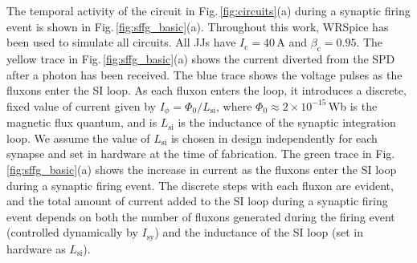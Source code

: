 \documentclass[twocolumn]{article}
\begin{document}
\begin{figure}[tb]
\end{figure}
The temporal activity of the circuit in Fig.\,\ref{fig:circuits}(a) during a synaptic firing event is shown in Fig.\,\ref{fig:sffg_basic}(a). Throughout this work, WRSpice \cite{wh1991} has been used to simulate all circuits. All JJs have $I_{\mathrm{c}} = 40$\,\textmu A and $\beta_{\mathrm{c}} = 0.95$. The yellow trace in Fig.\,\ref{fig:sffg_basic}(a) shows the current diverted from the SPD after a photon has been received. The blue trace shows the voltage pulses as the fluxons enter the SI loop. As each fluxon enters the loop, it introduces a discrete, fixed value of current given by $I_{\phi} = \Phi_0/L_{\mathrm{si}}$, where $\Phi_0 \approx 2\times 10^{-15}$\,Wb is the magnetic flux quantum, and is $L_{\mathrm{si}}$ is the inductance of the synaptic integration loop. We assume the value of $L_{\mathrm{si}}$ is chosen in design independently for each synapse and set in hardware at the time of fabrication. The green trace in Fig.\,\ref{fig:sffg_basic}(a) shows the increase in current as the fluxons enter the SI loop during a synaptic firing event. The discrete steps with each fluxon are evident, and the total amount of current added to the SI loop during a synaptic firing event depends on both the number of fluxons generated during the firing event (controlled dynamically by $I_{\mathrm{sy}}$) and the inductance of the SI loop (set in hardware as $L_{\mathrm{si}}$). 
\end{document}
